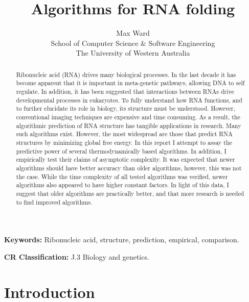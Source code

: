 \documentclass[12pt, a4paper]{article}
\title{Algorithms for RNA folding}
\author{Max Ward \\
School of Computer Science \& Software Engineering \\
The University of Western Australia}
\begin{document}
\maketitle

\begin{abstract}
Ribonucleic acid (RNA) drives many biological processes. In the last decade it has become apparent that it is important in meta-genetic pathways, allowing DNA to self regulate. In addition, it has been suggested that interactions between RNAs drive developmental processes in eukaryotes. To fully understand how RNA functions, and to further elucidate its role in biology, its structure must be understood. However, conventional imaging techniques are expensive and time consuming. As a result, the algorithmic prediction of RNA structure has tangible applications in research. Many such algorithms exist. However, the most widespread are those that predict RNA structures by minimizing global free energy. In this report I attempt to assay the predictive power of several thermodynamically based algorithms. In addition, I empirically test their claims of asymptotic complexity. It was expected that newer algorithms should have better accuracy than older algorithms, however, this was not the case. While the time complexity of all tested algorithms was verified, newer algorithms also appeared to have higher constant factors. In light of this data, I suggest that older algorithms are practically better, and that more research is needed to find improved algorithms.
\end{abstract}


{\bf Keywords:} Ribonucleic acid, structure, prediction, empirical, comparison.

{\bf CR Classification:} J.3 Biology and genetics.

\clearpage


\section{Introduction}
\end{document}
